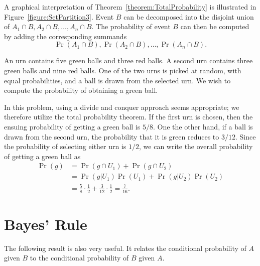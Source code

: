 A graphical interpretation of Theorem~\ref{theorem:TotalProbability} is illustrated in Figure~\ref{figure:SetPartition3}.
Event $B$ can be decomposed into the disjoint union of $A_1 \cap B, A_2 \cap B, \ldots, A_n \cap B$.
The probability of event $B$ can then be computed by adding the corresponding summands
\begin{equation*}
\Pr (A_1 \cap B), \Pr (A_2 \cap B), \ldots, \Pr (A_n \cap B) .
\end{equation*}

\begin{example}
An urn contains five green balls and three red balls.
A second urn contains three green balls and nine red balls.
One of the two urns is picked at random, with equal probabilities, and a ball is drawn from the selected urn.
We wish to compute the probability of obtaining a green ball.

In this problem, using a divide and conquer approach seems appropriate;
we therefore utilize the total probability theorem.
If the first urn is chosen, then the ensuing probability of getting a green ball is $5/8$.
One the other hand, if a ball is drawn from the second urn, the probability that it is green reduces to $3/12$.
Since the probability of selecting either urn is $1/2$, we can write the overall probability of getting a green ball as
\begin{equation*}
\begin{split}
\Pr (g) &= \Pr (g \cap U_1) + \Pr (g \cap U_2) \\
&= \Pr (g | U_1) \Pr (U_1) + \Pr (g | U_2) \Pr (U_2) \\
&= \frac{5}{8} \cdot \frac{1}{2} + \frac{3}{12} \cdot \frac{1}{2}
= \frac{7}{16}.
\end{split}
\end{equation*}
\end{example}


\section{Bayes' Rule}

The following result is also very useful.
It relates the conditional probability of $A$ given $B$ to the conditional probability of $B$ given $A$.

